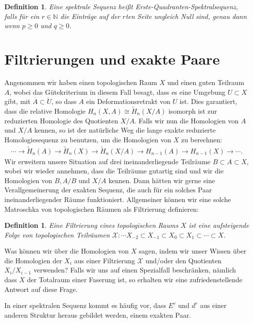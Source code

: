 \documentclass[12pt, hidelinks]{article}
\numberwithin{conj}{section}
\newtheorem{definition}[conj]{Definition}
\begin{document}
\begin{definition}
    Eine spektrale Sequenz heißt Erste-Quadranten-Spektralsequenz, falls für ein $r \in \mathbb{N}$ die Einträge auf der $r$ten Seite ungleich Null sind, genau dann wenn $p \geq 0$ und $q \geq 0$.
\end{definition}

\section{Filtrierungen und exakte Paare}
Angenommen wir haben einen topologischen Raum $X$ und einen guten Teilraum $A$, wobei das Gütekriterium in diesem Fall besagt, dass es eine Umgebung $U \subset X$ gibt, mit $\overline{A} \subset \mathring{U}$, so dass $A$ ein Deformationsretrakt von $U$ ist. Dies garantiert, dass die relative Homologie $H_n(X,A) \cong \tilde{H}_n(X/A)$ isomorph ist zur reduzierten Homologie des Quotienten $X/A$. Falls wir nun die Homologien von $A$ und $X/A$ kennen, so ist der natürliche Weg die lange exakte reduzierte Homologiesequenz zu benutzen, um die Homologien von $X$ zu berechnen:
\begin{align}
    \cdots \to \tilde{H}_n(A) \to \tilde{H}_n(X) \to \tilde{H}_n(X/A) \to H_{n-1}(A) \to H_{n-1}(X) \to \cdots.
\end{align}
Wir erweitern unsere Situation auf drei ineinanderliegende Teilräume $B \subset A \subset X$, wobei wir wieder annehmen, dass die Teilräume gutartig sind und wir die Homologien von $B, A/B$ und $X/A$ kennen. Dann hätten wir gerne eine Verallgemeinerung der exakten Sequenz, die auch für ein solches Paar ineinanderliegender Räume funktioniert. Allgemeiner können wir eine solche Matroschka von topologischen Räumen als Filtrierung definieren:

\begin{definition}
    Eine Filtrierung eines topologischen Raums $X$ ist eine aufsteigende Folge von topologischen Teilräumen $\mathcal{X}: \cdots X_{-2} \subset X_{-1} \subset X_{0} \subset X_{1} \subset \cdots \subset X$.
\end{definition}

Was können wir über die Homologien von $X$ sagen, indem wir unser Wissen über die Homologien der $X_i$ aus einer Filtrierung $\mathcal{X}$ und/oder den Quotienten $X_i/X_{i-1}$ verwenden? Falls wir uns auf einen Spezialfall beschränken, nämlich dass $X$ der Totalraum einer Faserung ist, so erhalten wir eine zufriedenstellende Antwort auf diese Frage.

In einer spektralen Sequenz kommt es häufig vor, dass $E^r$ und $d^r$ aus einer anderen Struktur heraus gebildet werden, einem exakten Paar.
\end{document}
